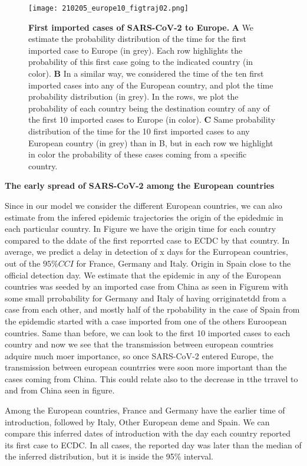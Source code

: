 \begin{figure}[h]
    \centering
    \texttt{[image: 210205\_europe10\_figtraj02.png]}
    \caption{\textbf{First imported cases of SARS-CoV-2 to Europe.} \textbf{A} We estimate the probability distribution of the time for the first imported case to Europe (in grey). Each row highlights the probability of this first case going to the indicated country (in color). \textbf{B} In a similar way, we considered the time of the ten first imported cases into any of the European country, and plot the time probability distribution (in grey). In the rows, we plot the probability of each country being the destination country of any of the first 10 imported cases to Europe (in color). \textbf{C} Same probability distribution of the time for the 10 first imported cases to any European country (in grey) than in B, but in each row we highlight in color the 
    probability of these cases coming from a specific country.}
    \label{fig:firstEUcountry}
\end{figure}


\textbf{The early spread of SARS-CoV-2 among the European countries}


Since in our model we consider the different European countries, we can also estimate from the infered epidemic trajectories the origin of the epidedmic in each particular country. In Figure we have the origin time for each country compared to the ddate of the first reporrted case to ECDC by that country. In average, we predict a delay in detection of x days for the Eurropean countries, out of the $95\% CCI$ for France, Germany and Italy. Origin in Spain close to the official detection day. We estimate that the epidemic in any of the European countries was seeded by an imported case from China as seen in Figurem with some small prrobability for Germany and Italy of having orriginatetdd from a case from each other, and mostly half of the rpobability in the case of Spain from the epidemdic started with a case imported from one of the others Euroopean countries. Same than before, we can look to the first 10 imported cases to each country and now we see that the transmission between european countries adquire much moer importance,  so once SARS-CoV-2 entered Europe, the transmission between european countrries were soon more important than the cases coming from China. This could relate also to the decrease in tthe trravel to and from China seen in figure.

Among the European countries, France and Germany have the earlier time of introduction, followed by Italy, Other European deme and Spain. We can compare this inferred dates of introduction with the day each country reported its first case to ECDC. In all cases, the reported day was later than the median of the inferred distribution, but it is inside the 95\% interval.\\

